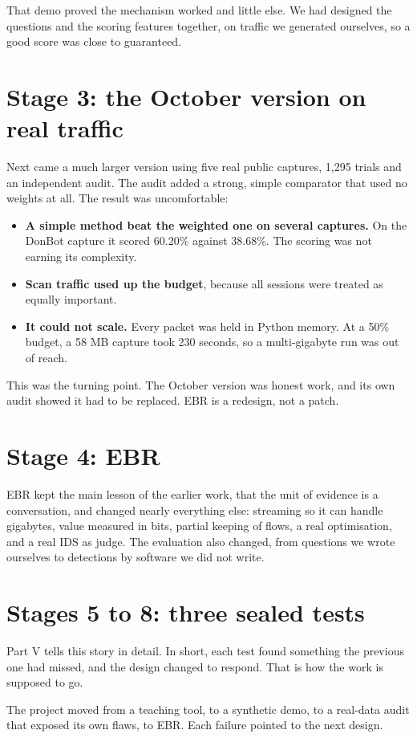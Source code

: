 \begin{honest}
That demo proved the mechanism worked and little else. We had designed the questions and the scoring features together, on traffic we generated ourselves, so a good score was close to guaranteed.
\end{honest}

\section{Stage 3: the October version on real traffic}
Next came a much larger version using five real public captures, 1,295 trials and an independent audit. The audit added a strong, simple comparator that used no weights at all. The result was uncomfortable:

\begin{itemize}
\item \textbf{A simple method beat the weighted one on several captures.} On the DonBot capture it scored 60.20\% against 38.68\%. The scoring was not earning its complexity.
\item \textbf{Scan traffic used up the budget}, because all sessions were treated as equally important.
\item \textbf{It could not scale.} Every packet was held in Python memory. At a 50\% budget, a 58 MB capture took 230 seconds, so a multi-gigabyte run was out of reach.
\end{itemize}

\begin{bigidea}
This was the turning point. The October version was honest work, and its own audit showed it had to be replaced. EBR is a redesign, not a patch.
\end{bigidea}

\section{Stage 4: EBR}
EBR kept the main lesson of the earlier work, that the unit of evidence is a conversation, and changed nearly everything else: streaming so it can handle gigabytes, value measured in bits, partial keeping of flows, a real optimisation, and a real IDS as judge. The evaluation also changed, from questions we wrote ourselves to detections by software we did not write.

\section{Stages 5 to 8: three sealed tests}
Part V tells this story in detail. In short, each test found something the previous one had missed, and the design changed to respond. That is how the work is supposed to go.

\begin{recap}
The project moved from a teaching tool, to a synthetic demo, to a real-data audit that exposed its own flaws, to EBR. Each failure pointed to the next design.
\end{recap}
